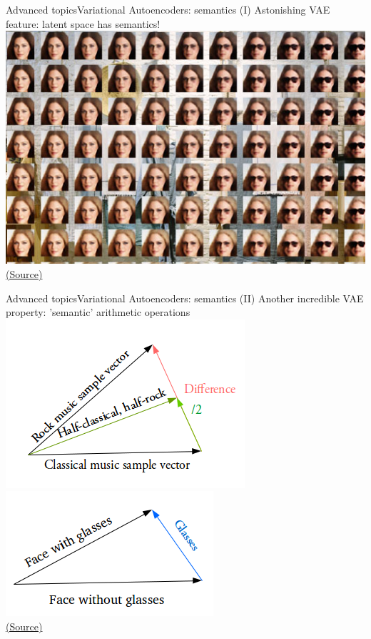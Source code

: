 \documentclass[10pt,compress]{beamer} %
\begin{document}
\begin{frame}{Advanced topics}{Variational Autoencoders: semantics (I)}
	Astonishing VAE feature: latent space has semantics!
	\centering\includegraphics[width=0.7\linewidth]{figs/faces.jpg}\\
	\scriptsize\href{https://www.compthree.com/blog/autoencoder/}{(Source)}
\end{frame}

\begin{frame}{Advanced topics}{Variational Autoencoders: semantics (II)}
	Another incredible VAE property: 'semantic' arithmetic operations
	\centering\includegraphics[width=0.3\linewidth]{figs/vector-vae1.png}\quad
	\centering\includegraphics[width=0.3\linewidth]{figs/vector-vae2.png}\\
	\scriptsize\href{https://towardsdatascience.com/intuitively-understanding-variational-autoencoders-1bfe67eb5daf}{(Source)}
\end{frame}
\end{document}
